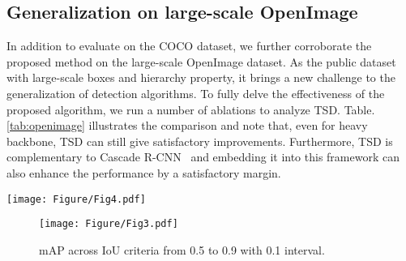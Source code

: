 \documentclass[10pt,twocolumn,letterpaper]{article}
\def \algname{TSD}
\begin{document}
\subsection{Generalization on large-scale \bf{OpenImage}}
In addition to evaluate on the COCO dataset, we further corroborate the proposed method on the large-scale OpenImage dataset.
As the public dataset with large-scale boxes and hierarchy property, it brings a new challenge to the generalization of detection algorithms. To fully delve the effectiveness of the proposed algorithm, we run a number of ablations to analyze \algname{}.
Table.\ref{tab:openimage} illustrates the comparison and note that, even for heavy backbone, \algname{} can still give satisfactory improvements. 
Furthermore, \algname{} is complementary to Cascade R-CNN~\cite{cai2018cascade} and embedding it into this framework can also enhance the performance by a satisfactory margin.





\begin{figure*}[h]
  \centering 
  \texttt{[image: Figure/Fig4.pdf]}
  \caption{Visualization of the learnt  and  on examples from the COCO \emph{minival} set. The first row indicates the proposal  (yellow box) and the derived  (red box) and  (pink point, center point in each grid). The second row is the final detected boxes where the white box is ground-truth. \algname{} deposes the false positives in the first two columns and in other columns, it regresses more precise boxes.} 
  \label{fig:vis}
\end{figure*}

\begin{figure}[h]
  \centering 
  \texttt{[image: Figure/Fig3.pdf]}
  \caption{mAP across IoU criteria from 0.5 to 0.9 with 0.1
interval.} 
  \label{fig:iou}
\end{figure}
\end{document}
